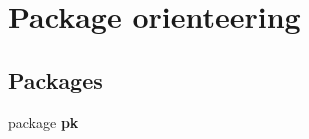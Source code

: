 \section{Package orienteering}
\label{namespaceorienteering}
\subsection*{Packages}
\begin{DoxyCompactItemize}
\item 
package \textbf{ pk}
\end{DoxyCompactItemize}
